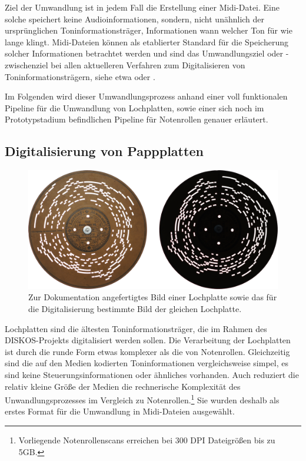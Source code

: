 Ziel der Umwandlung ist in jedem Fall die Erstellung einer Midi-Datei.
Eine solche speichert keine Audioinformationen, sondern, nicht unähnlich der ursprünglichen Toninformationsträger, Informationen wann welcher Ton für wie lange klingt.
Midi-Dateien können als etablierter Standard für die Speicherung solcher Informationen betrachtet werden und sind das Umwandlungsziel oder -zwischenziel bei allen aktuelleren Verfahren zum Digitalisieren von Toninformationsträgern, siehe etwa \textcite[65]{colmenares_2011} oder \textcite[518]{shi_2019}.

Im Folgenden wird dieser Umwandlungsprozess anhand einer voll funktionalen Pipeline für die Umwandlung von Lochplatten, sowie einer sich noch im Prototypstadium befindlichen Pipeline für Notenrollen genauer erläutert.

\subsection{Digitalisierung von Pappplatten}

\begin{figure}[t]
    \centering
    \includegraphics[width=\textwidth]{graphics/ariston_pictures.png}
    \caption{Zur Dokumentation angefertigtes Bild einer Lochplatte sowie das für die Digitalisierung bestimmte Bild der gleichen Lochplatte.}
    \label{pappplattenphotos}
\end{figure}

Lochplatten sind die ältesten Toninformationsträger, die im Rahmen des DISKOS-Projekts digitalisiert werden sollen.
Die Verarbeitung der Lochplatten ist durch die runde Form etwas komplexer als die von Notenrollen.
Gleichzeitig sind die auf den Medien kodierten Toninformationen vergleichsweise simpel, es sind keine Steuerungsinformationen oder ähnliches vorhanden.
Auch reduziert die relativ kleine Größe der Medien die rechnerische Komplexität des Unwandlungsprozesses im Vergleich zu Notenrollen.\footnote{Vorliegende Notenrollenscans erreichen bei 300 DPI Dateigrößen bis zu 5GB.}
Sie wurden deshalb als erstes Format für die Umwandlung in Midi-Dateien ausgewählt.

